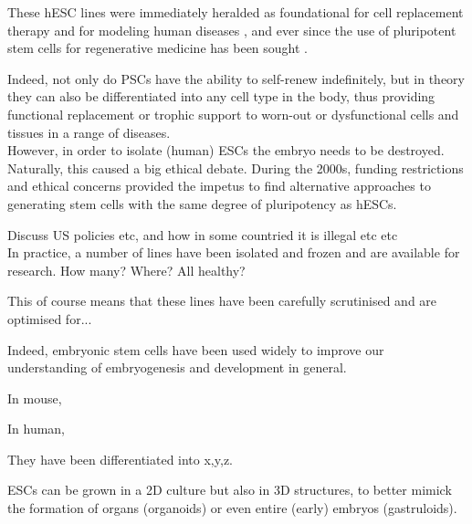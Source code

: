 These hESC lines were immediately heralded as foundational for cell replacement therapy and for modeling human diseases 
\cite{saha2009technical}, and ever since the use of pluripotent stem cells for regenerative medicine has been sought \cite{kimbrel2015current}.

Indeed, not only do PSCs have the ability to self-renew indefinitely, but in theory they can also be differentiated into any cell type in the body, thus providing functional replacement or trophic support to worn-out or dysfunctional cells and tissues in a range of diseases. \\

However, in order to isolate (human) ESCs the embryo needs to be destroyed.
Naturally, this caused a big ethical debate.
During the 2000s, funding restrictions and ethical concerns provided the impetus to find alternative approaches to generating stem cells with the same degree of pluripotency as hESCs. 


Discuss US policies etc, and how in some countried it is illegal etc etc\\

In practice, a number of lines have been isolated and frozen and are available for research.
How many? Where? All healthy?

This of course means that these lines have been carefully scrutinised and are optimised for...


Indeed, embryonic stem cells have been used widely to improve our understanding of embryogenesis and development in general. 

In mouse, 

In human,

They have been differentiated into x,y,z.

ESCs can be grown in a 2D culture but also in 3D structures, to better mimick the formation of organs (organoids) or even entire (early) embryos (gastruloids).\\



